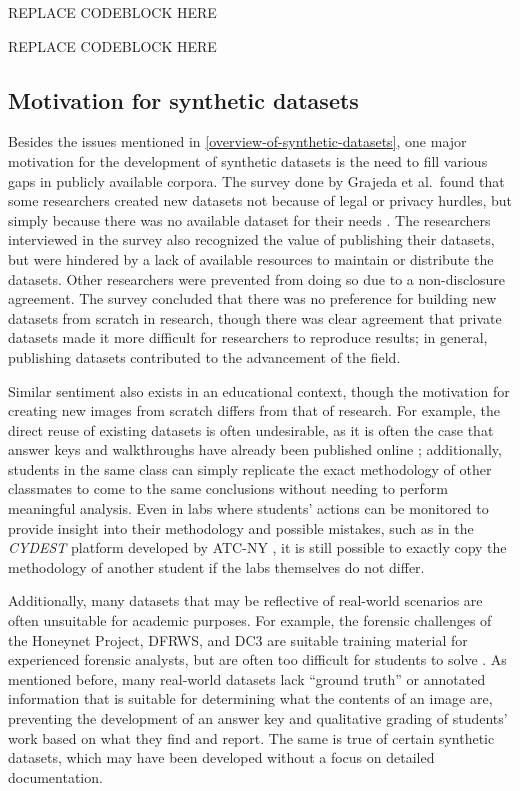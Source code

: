 \documentclass[letterpaper,12pt]{report}
\begin{document}
REPLACE CODEBLOCK HERE

REPLACE CODEBLOCK HERE

\subsection{Motivation for synthetic
datasets}\label{motivation-for-synthetic-datasets}

Besides the issues mentioned in \autoref{overview-of-synthetic-datasets}, one major motivation for the development of synthetic
datasets is the need to fill various gaps in publicly available corpora.
The survey done by Grajeda et al.~found that some researchers created
new datasets not because of legal or privacy hurdles, but simply because
there was no available dataset for their needs
\cite{grajedaAvailabilityDatasetsDigital2017}. The researchers
interviewed in the survey also recognized the value of publishing their
datasets, but were hindered by a lack of available resources to maintain
or distribute the datasets. Other researchers were prevented from doing
so due to a non-disclosure agreement. The survey concluded that there
was no preference for building new datasets from scratch in research,
though there was clear agreement that private datasets made it more
difficult for researchers to reproduce results; in general, publishing
datasets contributed to the advancement of the field.

Similar sentiment also exists in an educational context, though the
motivation for creating new images from scratch differs from that of
research. For example, the direct reuse of existing datasets is often
undesirable, as it is often the case that answer keys and walkthroughs
have already been published online
\cite{woodsCreatingRealisticCorpora2011}; additionally, students in
the same class can simply replicate the exact methodology of other
classmates to come to the same conclusions without needing to perform
meaningful analysis. Even in labs where students' actions can be
monitored to provide insight into their methodology and possible
mistakes, such as in the \emph{CYDEST} platform developed by ATC-NY
\cite{bruecknerAutomatedComputerForensics2008}, it is still possible
to exactly copy the methodology of another student if the labs
themselves do not differ.

Additionally, many datasets that may be reflective of real-world
scenarios are often unsuitable for academic purposes. For example, the
forensic challenges of the Honeynet Project, DFRWS, and DC3 are suitable
training material for experienced forensic analysts, but are often too
difficult for students to solve
\cite{woodsCreatingRealisticCorpora2011}. As mentioned before, many
real-world datasets lack ``ground truth'' or annotated information that
is suitable for determining what the contents of an image are,
preventing the development of an answer key and qualitative grading of
students' work based on what they find and report. The same is true of
certain synthetic datasets, which may have been developed without a
focus on detailed documentation.
\end{document}

